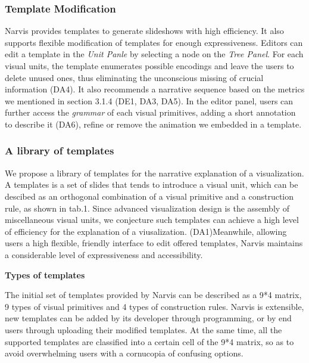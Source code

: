 \subsubsection{Template Modification} 
Narvis provides templates to generate slideshows with high efficiency. 
It also supports flexible modification of templates for enough expressiveness.
Editors can edit a template in the \textit{Unit Panle} by selecting a node on the \textit{Tree Panel}. For each visual units, the template enumerates possible encodings and leave the users to delete unused ones, thus eliminating the unconscious missing of crucial information (DA4). It also recommends a narrative sequence based on the metrics we mentioned in section 3.1.4 (DE1, DA3, DA5). 
In the editor panel, users can further access the \textit{grammar} of each visual primitives, adding a short annotation to describe it (DA6), refine or remove the animation we embedded in a template. 

\subsubsection{A library of templates}
We propose a library of templates for the narrative explanation of a visualization. A templates is a set of slides that tends to introduce a visual unit, which can be descibed as an orthogonal combination of a visual primitive and a construction rule, as shown in tab.1. Since advanced visualization design is the assembly of miscellaneous visual units, we conjecture such templates can achieve a high level of efficiency for the explanation of a viusalization. (DA1)Meanwhile, allowing users a high flexible, friendly interface to edit offered templates, Narvis maintains a considerable level of expressiveness and accessibility. 

\textbf{Types of templates}

The initial set of templates provided by Narvis can be described as  a 9*4 matrix, 9 types of visual primitives and 4 types of construction rules. Narvis is extensible, new templates can be added by its developer through programming, or by end users through uploading their modified templates. At the same time, all the supported templates are classified into a certain cell of the 9*4 matrix, so as to avoid overwhelming users with a cornucopia of confusing options.

